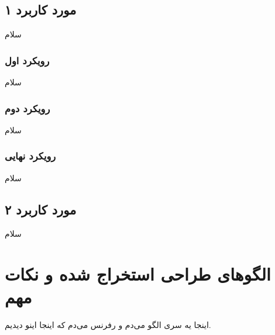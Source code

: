 \subsection{مورد کاربرد ۱}
سلام
\subsubsection{رویکرد اول}
سلام
\subsubsection{رویکرد دوم}
سلام
\subsubsection{رویکرد نهایی}
سلام
\subsection{مورد کاربرد ۲}
سلام

\section{الگوهای طراحی استخراج شده و نکات مهم}
اینجا یه سری الگو می‌دم و رفرنس می‌دم که اینجا اینو دیدیم.
